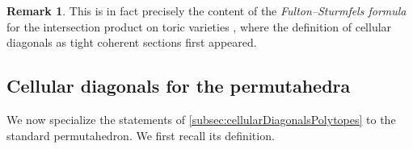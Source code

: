 \documentclass{amsart}
\theoremstyle{definition}
\newtheorem{remark}[theorem]{Remark}
\begin{document}
\begin{remark}
This is in fact precisely the content of the \emph{Fulton--Sturmfels formula} for the intersection product on toric varieties \cite[Thm.~4.2]{FultonSturmfels}, where the definition of cellular diagonals as tight coherent sections first appeared.
\end{remark}


\subsection{Cellular diagonals for the permutahedra}
\label{sec:cellularDiagonalsPermutahedra}

We now specialize the statements of \cref{subsec:cellularDiagonalsPolytopes} to the standard permutahedron.
We first recall its definition.
\end{document}
